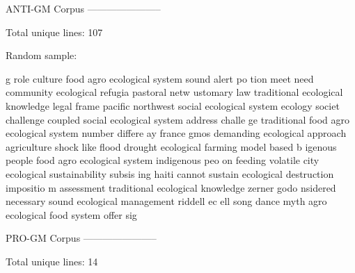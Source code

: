 \begin{footnotesize}
ANTI-GM Corpus\newline
-----------------------

Total unique lines: 107

Random sample:

g role culture food agro ecological system sound alert po\newline
tion meet need community ecological refugia pastoral netw\newline
ustomary law traditional ecological knowledge legal frame\newline
pacific northwest social ecological system ecology societ\newline
challenge coupled social ecological system address challe\newline
ge traditional food agro ecological system number differe\newline
ay france gmos demanding ecological approach agriculture \newline
shock like flood drought ecological farming model based b\newline
igenous people food agro ecological system indigenous peo\newline
on feeding volatile city ecological sustainability subsis\newline
ing haiti cannot sustain ecological destruction impositio\newline
m assessment traditional ecological knowledge zerner godo\newline
nsidered necessary sound ecological management riddell ec\newline
ell song dance myth agro ecological food system offer sig

PRO-GM Corpus\newline
-----------------------

Total unique lines: 14


\end{footnotesize}
